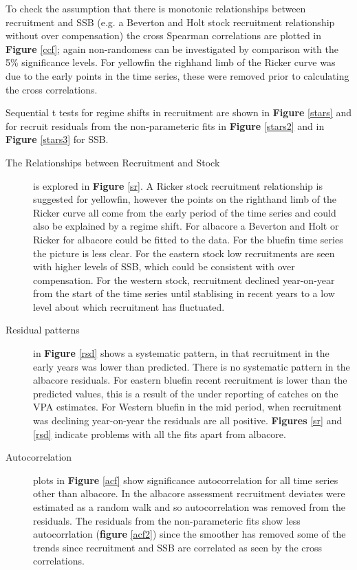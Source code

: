 \documentclass[a4paper, 10pt]{article}
\begin{document}
To check the assumption that there is monotonic relationships between recruitment and SSB (e.g. a Beverton and Holt stock recruitment relationship 
without over compensation) the cross Spearman correlations are plotted in \textbf{Figure} \ref{ccf}; again non-randomess can be investigated
by comparison with the 5\% significance levels. For yellowfin the righhand limb of the Ricker curve was due to the early points in the
time series, these were removed prior to calculating the cross correlations.

Sequential t tests for regime shifts \cite{rodionov2004sequential} in recruitment are shown in \textbf{Figure} \ref{stars} and 
for recruit residuals from the non-parameteric fits in \textbf{Figure} \ref{stars2} and in  \textbf{Figure} \ref{stars3} for SSB.

\begin{description}
 \item[The Relationships between Recruitment and Stock] is explored in \textbf{Figure} \ref{sr}.
 A Ricker stock recruitment relationship is suggested for yellowfin, however the points on the righthand 
 limb of the Ricker curve all come from the early period of the time series and could also be
 explained by a regime shift. For albacore a Beverton and Holt or Ricker for albacore could
 be fitted to the data. For the bluefin time series the picture is less clear. For 
 the eastern stock low recruitments are seen with higher levels of SSB, which could be consistent with
 over compensation. For the western stock, recruitment declined year-on-year from the start of 
 the time series until stablising in recent years to a low level about which recruitment has fluctuated.
 
 \item[Residual patterns]  in \textbf{Figure} \ref{rsd} shows a systematic pattern, in that recruitment
 in the early years was lower than predicted. There is no systematic pattern in the albacore residuals.
 For eastern bluefin recent recruitment is lower than the predicted values, this is a result of the under reporting
 of catches on the VPA estimates. For Western bluefin in the mid period, when recruitment was declining year-on-year the 
 residuals are all positive.  
 \textbf{Figures} \ref{sr} and \ref{rsd} indicate problems with all the fits apart from albacore. 
 
 \item[Autocorrelation] plots in \textbf{Figure} \ref{acf} show significance autocorrelation for all time series other
 than albacore. In the albacore assessment recruitment deviates were estimated as a random walk and so autocorrelation was
 removed from the residuals. 
 The residuals from the non-parameteric fits show less autocorrlation  (\textbf{figure} \ref{acf2}) since
 the smoother has removed some of the trends since recruitment and SSB are correlated as
 seen by the cross correlations.
 

\end{description}
\end{document}
